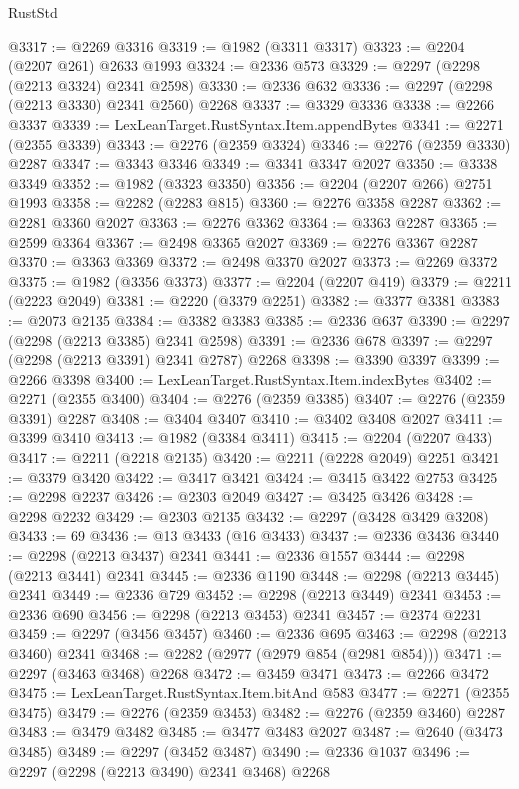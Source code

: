 \begin{lexlean}{RustStd}
\begin{coremodule}
{\begin{coremodule}
{{{{{{{{{{{{{{{{{{{{{{{{{{{{{{{{{{{{{{{{{{{{{{{{{{{{{{@3317 := @2269 @3316
@3319 := @1982 (@3311 @3317)
@3323 := @2204 (@2207 @261) @2633 @1993
@3324 := @2336 @573
@3329 := @2297 (@2298 (@2213 @3324) @2341 @2598)
@3330 := @2336 @632
@3336 := @2297 (@2298 (@2213 @3330) @2341 @2560) @2268
@3337 := @3329 @3336
@3338 := @2266 @3337
@3339 := LexLeanTarget.RustSyntax.Item.appendBytes
@3341 := @2271 (@2355 @3339)
@3343 := @2276 (@2359 @3324)
@3346 := @2276 (@2359 @3330) @2287
@3347 := @3343 @3346
@3349 := @3341 @3347 @2027
@3350 := @3338 @3349
@3352 := @1982 (@3323 @3350)
@3356 := @2204 (@2207 @266) @2751 @1993
@3358 := @2282 (@2283 @815)
@3360 := @2276 @3358 @2287
@3362 := @2281 @3360 @2027
@3363 := @2276 @3362
@3364 := @3363 @2287
@3365 := @2599 @3364
@3367 := @2498 @3365 @2027
@3369 := @2276 @3367 @2287
@3370 := @3363 @3369
@3372 := @2498 @3370 @2027
@3373 := @2269 @3372
@3375 := @1982 (@3356 @3373)
@3377 := @2204 (@2207 @419)
@3379 := @2211 (@2223 @2049)
@3381 := @2220 (@3379 @2251)
@3382 := @3377 @3381
@3383 := @2073 @2135
@3384 := @3382 @3383
@3385 := @2336 @637
@3390 := @2297 (@2298 (@2213 @3385) @2341 @2598)
@3391 := @2336 @678
@3397 := @2297 (@2298 (@2213 @3391) @2341 @2787) @2268
@3398 := @3390 @3397
@3399 := @2266 @3398
@3400 := LexLeanTarget.RustSyntax.Item.indexBytes
@3402 := @2271 (@2355 @3400)
@3404 := @2276 (@2359 @3385)
@3407 := @2276 (@2359 @3391) @2287
@3408 := @3404 @3407
@3410 := @3402 @3408 @2027
@3411 := @3399 @3410
@3413 := @1982 (@3384 @3411)
@3415 := @2204 (@2207 @433)
@3417 := @2211 (@2218 @2135)
@3420 := @2211 (@2228 @2049) @2251
@3421 := @3379 @3420
@3422 := @3417 @3421
@3424 := @3415 @3422 @2753
@3425 := @2298 @2237
@3426 := @2303 @2049
@3427 := @3425 @3426
@3428 := @2298 @2232
@3429 := @2303 @2135
@3432 := @2297 (@3428 @3429 @3208)
@3433 := 69
@3436 := @13 @3433 (@16 @3433)
@3437 := @2336 @3436
@3440 := @2298 (@2213 @3437) @2341
@3441 := @2336 @1557
@3444 := @2298 (@2213 @3441) @2341
@3445 := @2336 @1190
@3448 := @2298 (@2213 @3445) @2341
@3449 := @2336 @729
@3452 := @2298 (@2213 @3449) @2341
@3453 := @2336 @690
@3456 := @2298 (@2213 @3453) @2341
@3457 := @2374 @2231
@3459 := @2297 (@3456 @3457)
@3460 := @2336 @695
@3463 := @2298 (@2213 @3460) @2341
@3468 := @2282 (@2977 (@2979 @854 (@2981 @854)))
@3471 := @2297 (@3463 @3468) @2268
@3472 := @3459 @3471
@3473 := @2266 @3472
@3475 := LexLeanTarget.RustSyntax.Item.bitAnd @583
@3477 := @2271 (@2355 @3475)
@3479 := @2276 (@2359 @3453)
@3482 := @2276 (@2359 @3460) @2287
@3483 := @3479 @3482
@3485 := @3477 @3483 @2027
@3487 := @2640 (@3473 @3485)
@3489 := @2297 (@3452 @3487)
@3490 := @2336 @1037
@3496 := @2297 (@2298 (@2213 @3490) @2341 @3468) @2268
}}}}}}}}}}}}}}}}}}}}}}}}}}}}}}}}}}}}}}}}}}}}}}}}}}}}}}
\end{coremodule}}
\end{coremodule}
\end{lexlean}
